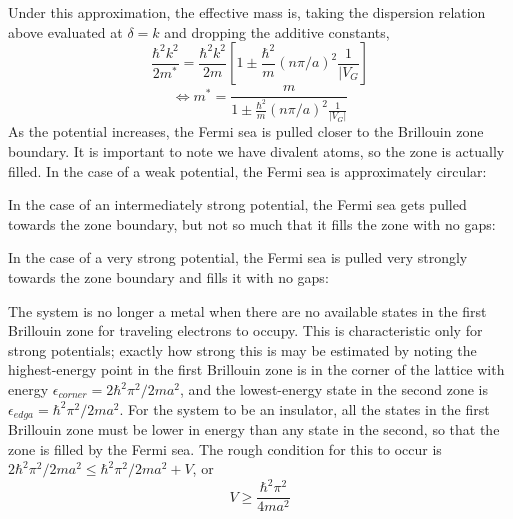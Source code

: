\documentclass{article}
\begin{document}
Under this approximation, the effective mass is, taking the dispersion relation above evaluated at $\delta=k$ and dropping the additive
constants,
\[
  \frac{\hbar^{2}k^{2}}{2m^{*}}=\frac{\hbar^{2}k^{2}}{2m}\left[ 1\pm\frac{\hbar^{2}}{m}(n\pi/a)^{2}\frac{1}{|V_{G}} \right]
\]
\[
  \Leftrightarrow m^{*}=\frac{m}{1\pm\frac{\hbar^{2}}{m}(n\pi/a)^{2}\frac{1}{|V_{G}|}}
\]
As the potential increases, the Fermi sea is pulled closer to the Brillouin zone boundary.
It is important to note we have divalent atoms, so the zone is actually filled.
In the case of a weak potential, the Fermi sea is approximately circular:
\begin{center}
\end{center}
In the case of an intermediately strong potential, the Fermi sea gets pulled towards the zone boundary, but not so much that it fills the
zone with no gaps:
\begin{center}
\end{center}
In the case of a very strong potential, the Fermi sea is pulled very strongly towards the zone boundary and fills it with no gaps:
\begin{center}
\end{center}
The system is no longer a metal when there are no available states in the first Brillouin zone for traveling electrons to occupy.
This is characteristic only for strong potentials; exactly how strong this is may be estimated by noting the highest-energy
point in the first Brillouin zone is in the corner of the lattice with energy $\epsilon_{corner}=2\hbar^{2}\pi^{2}/2ma^{2}$,
and the lowest-energy state in the second zone is $\epsilon_{edga}=\hbar^{2}\pi^{2}/2ma^{2}$.
For the system to be an insulator, all the states in the first Brillouin zone must be lower in energy than any state in the second, so
that the zone is filled by the Fermi sea.
The rough condition for this to occur is $2\hbar^{2}\pi^{2}/2ma^{2}\leq \hbar^{2}\pi^{2}/2ma^{2}+V$, or
\[
  V\geq \frac{\hbar^{2}\pi^{2}}{4ma^{2}}
\]
\end{document}
